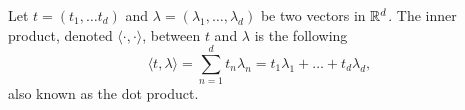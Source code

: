 \documentclass[../thesis.tex]{subfiles}
\begin{document}
\begin{definition}\label{eq:dot_prod}
    Let $t=(t_1,\dots t_d)$ and $\lambda=(\lambda_1, \dots, \lambda_d)$ be two vectors in $\mathbb{R}^d$. The inner product, denoted $\langle \cdot, \cdot \rangle$, between $t$ and $\lambda$ is the following 
    \begin{equation}
        \langle t, \lambda \rangle = \sum_{n=1}^d t_n \lambda_n = t_1\lambda_1 + \dots + t_d\lambda_d,
    \end{equation}
    also known as the dot product. 
\end{definition}
\end{document}
